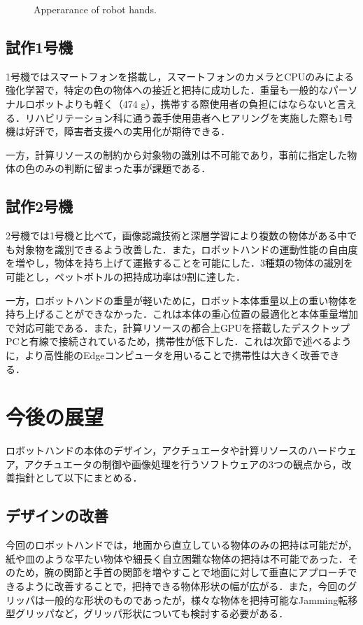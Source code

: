 \begin{figure}[H]
\begin{minipage}{0.3\hsize}
    \end{minipage}
    \caption{Apperarance of robot hands.}
    \label{fig:ロボットハンドまとめ}
\end{figure}


\subsection*{試作1号機}
1号機ではスマートフォンを搭載し，スマートフォンのカメラとCPUのみによる強化学習で，特定の色の物体への接近と把持に成功した．重量も一般的なパーソナルロボットよりも軽く（474 g），携帯する際使用者の負担にはならないと言える．リハビリテーション科に通う義手使用患者へヒアリングを実施した際も1号機は好評で，障害者支援への実用化が期待できる．

一方，計算リソースの制約から対象物の識別は不可能であり，事前に指定した物体の色のみの判断に留まった事が課題である．

\subsection*{試作2号機}
2号機では1号機と比べて，画像認識技術と深層学習により複数の物体がある中でも対象物を識別できるよう改善した．また，ロボットハンドの運動性能の自由度を増やし，物体を持ち上げて運搬することを可能にした．3種類の物体の識別を可能とし，ペットボトルの把持成功率は9割に達した．

一方，ロボットハンドの重量が軽いために，ロボット本体重量以上の重い物体を持ち上げることができなかった．これは本体の重心位置の最適化と本体重量増加で対応可能である．また，計算リソースの都合上GPUを搭載したデスクトップPCと有線で接続されているため，携帯性が低下した．これは次節で述べるように，より高性能のEdgeコンピュータを用いることで携帯性は大きく改善できる．


\section{今後の展望}\label{sec:今後の展望}
ロボットハンドの本体のデザイン，アクチュエータや計算リソースのハードウェア，アクチュエータの制御や画像処理を行うソフトウェアの3つの観点から，改善指針として以下にまとめる．

\subsection*{デザインの改善}
今回のロボットハンドでは，地面から直立している物体のみの把持は可能だが，紙や皿のような平たい物体や細長く自立困難な物体の把持は不可能であった．そのため，腕の関節と手首の関節を増やすことで地面に対して垂直にアプローチできるように改善することで，把持できる物体形状の幅が広がる．また，今回のグリッパは一般的な形状のものであったが，様々な物体を把持可能なJamming転移型グリッパ\cite{jamminggripper}など，グリッパ形状についても検討する必要がある．

